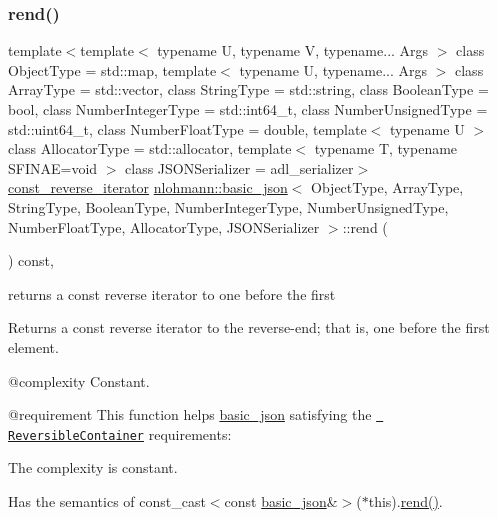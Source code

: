 \subsubsection{\texorpdfstring{rend()}{rend()}\hspace{0.1cm}{\footnotesize\ttfamily [2/2]}}
{\footnotesize\ttfamily template$<$template$<$ typename U, typename V, typename... Args $>$ class Object\+Type = std\+::map, template$<$ typename U, typename... Args $>$ class Array\+Type = std\+::vector, class String\+Type  = std\+::string, class Boolean\+Type  = bool, class Number\+Integer\+Type  = std\+::int64\+\_\+t, class Number\+Unsigned\+Type  = std\+::uint64\+\_\+t, class Number\+Float\+Type  = double, template$<$ typename U $>$ class Allocator\+Type = std\+::allocator, template$<$ typename T, typename S\+F\+I\+N\+A\+E=void $>$ class J\+S\+O\+N\+Serializer = adl\+\_\+serializer$>$ \\
\mbox{\hyperlink{classnlohmann_1_1basic__json_a72be3c24bfa24f0993d6c11af03e7404}{const\+\_\+reverse\+\_\+iterator}} \mbox{\hyperlink{classnlohmann_1_1basic__json}{nlohmann\+::basic\+\_\+json}}$<$ Object\+Type, Array\+Type, String\+Type, Boolean\+Type, Number\+Integer\+Type, Number\+Unsigned\+Type, Number\+Float\+Type, Allocator\+Type, J\+S\+O\+N\+Serializer $>$\+::rend (\begin{DoxyParamCaption}{ }\end{DoxyParamCaption}) const\hspace{0.3cm}{\ttfamily [inline]}, {\ttfamily [noexcept]}}



returns a const reverse iterator to one before the first 

Returns a const reverse iterator to the reverse-\/end; that is, one before the first element.

 @complexity Constant.

@requirement This function helps {\ttfamily \mbox{\hyperlink{classnlohmann_1_1basic__json}{basic\+\_\+json}}} satisfying the \href{http://en.cppreference.com/w/cpp/concept/ReversibleContainer}{\texttt{ Reversible\+Container}} requirements\+:
\begin{DoxyItemize}
\item The complexity is constant.
\item Has the semantics of {\ttfamily const\+\_\+cast$<$const \mbox{\hyperlink{classnlohmann_1_1basic__json}{basic\+\_\+json}}\&$>$($\ast$this).\mbox{\hyperlink{classnlohmann_1_1basic__json_ac77aed0925d447744676725ab0b6d535}{rend()}}}.
\end{DoxyItemize}

